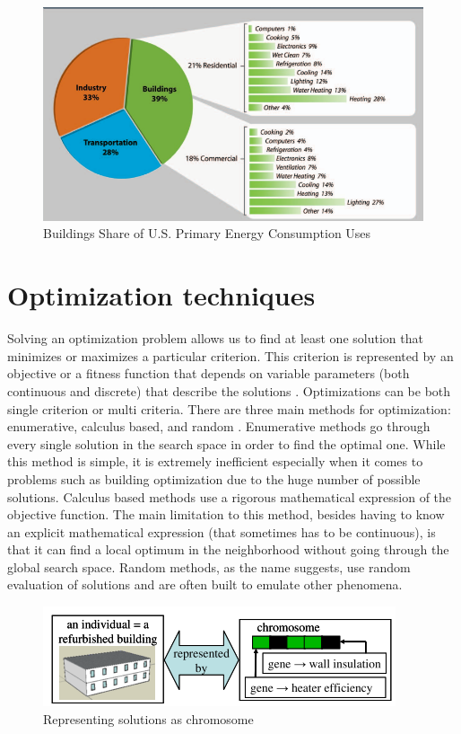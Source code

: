 \begin{figure}[htbp]
\centering
\includegraphics[width=0.8\linewidth,scale=0.6]{images/energy.png}
\caption{Buildings Share of U.S. Primary Energy Consumption 
Uses \cite{wri}}
\label{fig:energy}
\end{figure}

\section{Optimization techniques}\label{sec:stateofart}
Solving an optimization problem allows us to find at least one solution that 
minimizes or maximizes a particular criterion. This criterion is represented by an objective or a fitness function that depends on variable parameters (both continuous and discrete) that describe the solutions \cite{Pernodet2009}. 
Optimizations can be both single criterion or multi criteria. There are three 
main methods for optimization: enumerative, calculus based, and random \cite{Pernodet2009}. Enumerative methods go through every single solution in the search space in order to find the optimal one. While this method is simple, it is extremely inefficient especially when it comes to problems such as building optimization due to the huge number of possible solutions. Calculus based methods use a rigorous mathematical expression of the objective function. The main limitation to this method, besides having to know an explicit mathematical expression (that sometimes has to be continuous), is that it can find a local optimum in the neighborhood without going through the global search space. Random methods, as the name suggests, use random evaluation of solutions and are often built to emulate other phenomena.

\begin{figure}[htbp]
\centering
\includegraphics[width =0.7\linewidth]{images/pernodet.png}
\caption{Representing solutions as chromosome \cite{Pernodet2009}}
\label{fig:pernodet}
\end{figure}


